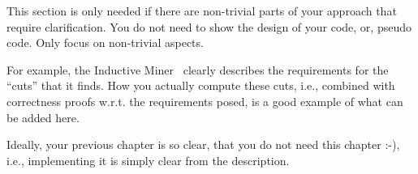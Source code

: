 This section is only needed if there are non-trivial parts of your approach that require clarification.
You do not need to show the design of your code, or, pseudo code.
Only focus on non-trivial aspects.

For example, the Inductive Miner~\cite{DBLP:conf/apn/LeemansFA13} clearly describes the requirements for the \enquote{cuts} that it finds.
How you actually compute these cuts, i.e., combined with correctness proofs w.r.t. the requirements posed, is a good example of what can be added here.

Ideally, your previous chapter is so clear, that you do not need this chapter :-), i.e., implementing it is simply clear from the description.